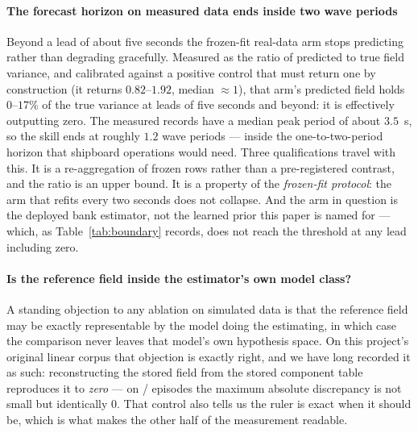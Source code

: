 \documentclass[review]{elsarticle}
\begin{document}
\paragraph{The forecast horizon on measured data ends inside two wave periods}
Beyond a lead of about five seconds the frozen-fit real-data arm stops predicting rather
than degrading gracefully. Measured as the ratio of predicted to true field variance, and
calibrated against a positive control that must return one by construction (it returns
$0.82$--$1.92$, median $\approx 1$), that arm's predicted field holds $0$--$17\%$ of the
true variance at leads of five seconds and beyond: it is effectively outputting zero. The
measured records have a median peak period of about $3.5$~s, so the skill ends at roughly
$1.2$ wave periods --- inside the one-to-two-period horizon that shipboard operations
would need. Three qualifications travel with this. It is a re-aggregation of frozen rows
rather than a pre-registered contrast, and the ratio is an upper bound. It is a property
of the \emph{frozen-fit protocol}: the arm that refits every two seconds does not
collapse. And the arm in question is the deployed bank estimator, not the learned prior
this paper is named for --- which, as Table~\ref{tab:boundary} records, does not reach
the threshold at any lead including zero.

\paragraph{Is the reference field inside the estimator's own model class?}
A standing objection to any ablation on simulated data is that the reference field may
be exactly representable by the model doing the estimating, in which case the
comparison never leaves that model's own hypothesis space. On this project's original
linear corpus that objection is exactly right, and we have long recorded it as such:
reconstructing the stored field from the stored component table reproduces it to
\emph{zero} --- on \COneCtrlN{}/\COneCtrlN{} episodes the maximum absolute discrepancy
is not small but identically $0$. That control also tells us the ruler is exact when it
should be, which is what makes the other half of the measurement readable.
\end{document}
